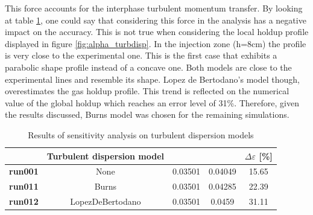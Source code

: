 \documentclass[11pt,a4paper]{article}
\newcommand{\thead}[2][.95in]{%
  \vbox{\hsize#1\baselineskip11pt\centering\vspace*{3pt}#2\par}}
\begin{document}
This force accounts for the interphase turbulent momentum transfer. By looking at table \ref{table:turbulent_dispersion_models}, one could say that considering this force in the analysis has a negative impact on the accuracy. This is not true when considering the local holdup profile displayed in figure \ref{fig:alpha_turbdisp}. In the injection zone (h=8cm) the profile is very close to the experimental one. This is the first case that exhibits a parabolic shape profile instead of a concave one. Both models are close to the experimental lines and resemble its shape. Lopez de Bertodano's model though, overestimates the gas holdup profile. This trend is reflected on the numerical value of the global holdup which reaches an error level of 31\%. Therefore, given the results discussed, Burns model was chosen for the remaining simulations.

\begin{table}[H]
    \centering 
    \begin{tabular}{|p{8em} c c c c|}
    \hline
    \rowcolor{bluePoli!40}
    & \textbf{Turbulent dispersion model} & \thead{Experimental holdup [-]} & \thead{Numerical holdup [-]} & $\Delta \varepsilon$ [\%] \T\B \\
    \hline \hline
    \textbf{run001} & None & 0.03501 & 0.04049 & 15.65\T\B \\
    \textbf{run011} & Burns & 0.03501 & 0.04285 & 22.39\T\B \\
    \textbf{run012} & LopezDeBertodano & 0.03501 & 0.0459 & 31.11\T\B \\
    \hline
    \end{tabular}
    \\[10pt]
    \caption{Results of sensitivity analysis on turbulent dispersion models}
    \label{table:turbulent_dispersion_models}
\end{table}
\end{document}

